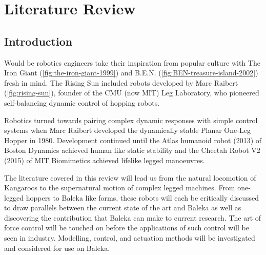 \chapter{Literature Review}

\section{Introduction}

Would be robotics engineers take their inspiration from popular culture with The Iron Giant (\cref{fig:the-iron-giant-1999}) and B.E.N. (\cref{fig:BEN-treasure-island-2002}) fresh in mind. The Rising Sun included robots developed by Marc Raibert (\cref{fig:rising-sun}), founder of the CMU (now MIT) Leg Laboratory, who pioneered self-balancing dynamic control of hopping robots. 

Robotics turned towards pairing complex dynamic responses with simple control systems when Marc Raibert developed the dynamically stable Planar One-Leg Hopper in 1980. Development continued until the Atlas humanoid robot (2013) of Boston Dynamics achieved human like static stability and the Cheetah Robot V2 (2015) of MIT Biomimetics achieved lifelike legged manoeuvres. 

The literature covered in this review will lead us from the natural locomotion of Kangaroos to the supernatural motion of complex legged machines. From one-legged hoppers to Baleka like forms, these robots will each be critically discussed to draw parallels between the current state of the art and Baleka as well as discovering the contribution that Baleka can make to current research. The art of force control will be touched on before the applications of such control will be seen in industry. Modelling, control, and actuation methods will be investigated and considered for use on Baleka.

